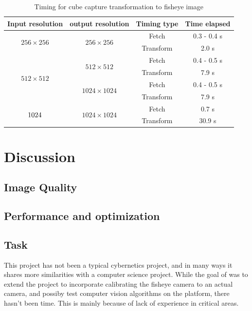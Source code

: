 \begin{table}[!htb]
    \centering
    \begin{tabular}{|c|c|c|c|} \hline
        \textbf{Input resolution} & \textbf{output resolution} & \textbf{Timing type} & \textbf{Time elapsed} \\ \hline \hline
        \multirow{2}{*}{$256 \times 256$} & \multirow{2}{*}{$256 \times 256$} & Fetch & 0.3 - 0.4 s\\ \cline{3-4}
         & & Transform & 2.0 s\\ \hline
        \multirow{4}{*}{$512 \times 512$} & \multirow{2}{*}{$512 \times 512$} & Fetch & 0.4 - 0.5 s \\ \cline{3-4}
         & & Transform & 7.9 s\\ \cline{2-4}
         & \multirow{2}{*}{$1024 \times 1024$} & Fetch & 0.4 - 0.5 s\\ \cline{3-4}
         & & Transform & 7.9 s\\ \hline
        \multirow{2}{*}{$1024 \time 1024$} & \multirow{2}{*}{$1024 \times 1024$} & Fetch & 0.7 s\\ \cline{3-4}
         & & Transform & 30.9 s\\ \hline
    \end{tabular}
    \caption{Timing for cube capture transformation to fisheye image}
    \label{tab:res_timing_cube_capture}
\end{table}


\section{Discussion}



\subsection{Image Quality}

\subsection{Performance and optimization}

\subsection{Task}

This project has not been a typical cybernetics project, and in many ways it shares more similarities with a computer science project. While the goal of was to extend the project to incorporate calibrating the fisheye camera to an actual camera, and possiby test computer vision algorithms on the platform, there hasn't been time. This is mainly because of lack of experience in critical areas. 

